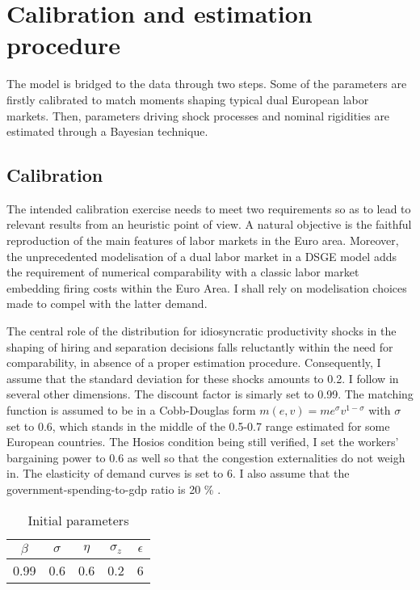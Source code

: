 \section{Calibration and estimation procedure}

The model is bridged to the data through two steps. Some of the parameters are firstly calibrated to match moments shaping typical dual European labor markets. Then, parameters driving shock processes and nominal rigidities are estimated through a Bayesian technique. 

\subsection{Calibration}

The intended calibration exercise needs to meet two requirements so as to lead to relevant results from an heuristic point of view. A natural objective is the faithful reproduction of the main features of labor markets in the Euro area. Moreover, the unprecedented modelisation of a dual labor market in a DSGE model adds the requirement of numerical comparability with a classic labor market embedding firing costs within the Euro Area. I shall rely on modelisation choices \citet{thomas2009labor} made to compel with the latter demand.

The central role of the distribution for idiosyncratic productivity shocks in the shaping of hiring and separation decisions falls reluctantly within the need for comparability, in absence of a proper estimation procedure. Consequently, I assume that the standard deviation for these shocks amounts to 0.2. I follow \citet{thomas2009labor} in several other dimensions. The discount factor is simarly set to 0.99. The matching function is assumed to be in a Cobb-Douglas form $m\left(e,v\right) = m e^{\sigma} v^{1-\sigma}$ with $\sigma$ set to 0.6, which stands in the middle of the 0.5-0.7 range \citet{burda1994gross} estimated for some European countries. The Hosios condition being still verified, I set the workers' bargaining power to 0.6 as well so that the congestion externalities do not weigh in. The elasticity of demand curves is set to 6. I also assume that the government-spending-to-gdp ratio is 20 \% .

\begin{table}[H]
\centering
\begin{tabular}{|c c c c c|}
\hline
$\beta$ & $\sigma$ & $\eta$ & $\sigma_z$ & $\epsilon$\\
\hline
0.99 & 0.6 & 0.6 & 0.2 & 6\\
\hline
\end{tabular}
\caption{Initial parameters \label{parameters}}
\end{table}

